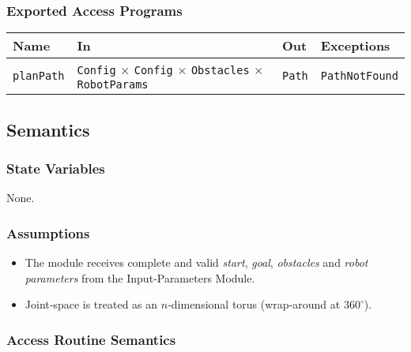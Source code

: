 \documentclass[12pt, titlepage]{article}
\begin{document}
\subsubsection{Exported Access Programs}
\begin{center}
\renewcommand{\arraystretch}{1.35}
\begin{tabular}{p{3.1cm} p{5.3cm} p{3.8cm} p{3.2cm}}
\toprule
\textbf{Name} & \textbf{In} & \textbf{Out} & \textbf{Exceptions}\\ \midrule
\texttt{planPath} & \texttt{Config} $\times$ \texttt{Config} $\times$ \texttt{Obstacles} $\times$ \texttt{RobotParams} & \texttt{Path} & \texttt{PathNotFound} \\
\bottomrule
\end{tabular}
\end{center}

\subsection{Semantics}
\subsubsection{State Variables}
None.

\subsubsection{Assumptions}
\begin{itemize}
  \item The module receives complete and valid \textit{start}, \textit{goal}, \textit{obstacles}
        and \textit{robot parameters} from the Input‑Parameters Module.
  \item Joint‑space is treated as an $n$‑dimensional torus
        (wrap‑around at $360^{\circ}$).
\end{itemize}

\subsubsection{Access Routine Semantics}
\end{document}
